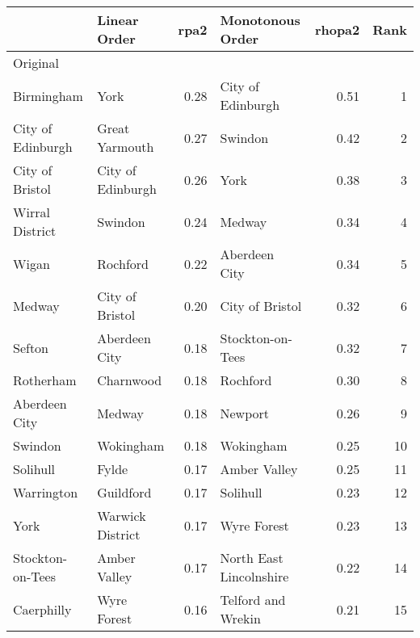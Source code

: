 \begin{tabular}{llrlrr}
\toprule
{} &               Linear Order &  rpa2 &           Monotonous Order &  rhopa2 &  Rank \\
\midrule
Original                  &                            &       &                            &         &       \\
Birmingham                &                       York &  0.28 &          City of Edinburgh &    0.51 &     1 \\
City of Edinburgh         &             Great Yarmouth &  0.27 &                    Swindon &    0.42 &     2 \\
City of Bristol           &          City of Edinburgh &  0.26 &                       York &    0.38 &     3 \\
Wirral District           &                    Swindon &  0.24 &                     Medway &    0.34 &     4 \\
Wigan                     &                   Rochford &  0.22 &              Aberdeen City &    0.34 &     5 \\
Medway                    &            City of Bristol &  0.20 &            City of Bristol &    0.32 &     6 \\
Sefton                    &              Aberdeen City &  0.18 &           Stockton-on-Tees &    0.32 &     7 \\
Rotherham                 &                  Charnwood &  0.18 &                   Rochford &    0.30 &     8 \\
Aberdeen City             &                     Medway &  0.18 &                    Newport &    0.26 &     9 \\
Swindon                   &                  Wokingham &  0.18 &                  Wokingham &    0.25 &    10 \\
Solihull                  &                      Fylde &  0.17 &               Amber Valley &    0.25 &    11 \\
Warrington                &                  Guildford &  0.17 &                   Solihull &    0.23 &    12 \\
York                      &           Warwick District &  0.17 &                Wyre Forest &    0.23 &    13 \\
Stockton-on-Tees          &               Amber Valley &  0.17 &    North East Lincolnshire &    0.22 &    14 \\
Caerphilly                &                Wyre Forest &  0.16 &         Telford and Wrekin &    0.21 &    15 \\

\end{tabular}
